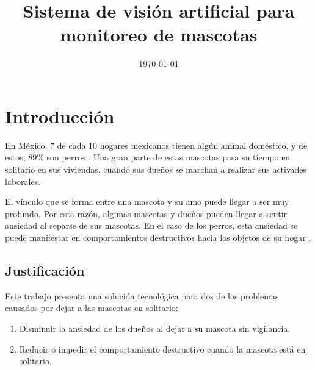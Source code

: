 \documentclass[12pt,a4paper]{proyectoinnovacion}
\title{Sistema de visión artificial para monitoreo de mascotas}
\date{\today}
\begin{document}
\maketitle

{
  \setcounter{page}{2} 
  \hypersetup{linkcolor=black}
  \tableofcontents\thispagestyle{fancy}
}
\pagebreak

\section{Introducción}

En México, 7 de cada 10 hogares mexicanos tienen algún animal doméstico, y de estos, 89\% son perros \parencite{inegi2016}. Una gran parte de estas mascotas pasa su tiempo en solitario en sus viviendas, cuando sus dueños se marchan a realizar sus activades laborales.

El vínculo que se forma entre una mascota y su amo puede llegar a ser muy profundo. Por esta razón, algunas mascotas y dueños pueden llegar a sentir ansiedad al separse de sus mascotas. En el caso de los perros, esta ansiedad se puede manifestar en comportamientos destructivos hacia los objetos de su hogar \parencite{parthasarathy2006}. 


\subsection{Justificación}
\label{sec:justificacion}

Este trabajo presenta una solución tecnológica para dos de los problemas causados por dejar a las mascotas en solitario:

\begin{enumerate}
  \item Disminuir la ansiedad de los dueños al dejar a su mascota sin vigilancia.
  \item Reducir o impedir el comportamiento destructivo cuando la mascota está en solitario. 
\end{enumerate}
\end{document}
